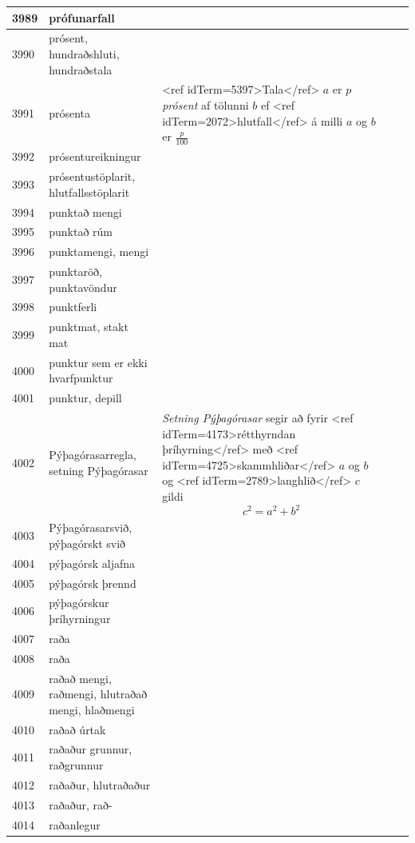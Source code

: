 \begin{longtable}{p{}|p{}|p{}|p{}|p{}}
\hline
3989 & prófunarfall &  &  &  \\
\hline
3990 & prósent, hundraðshluti, hundraðstala &  &  &  \\
\hline
3991 & prósenta & <ref idTerm=5397>Tala</ref> $a$ er \textit{$p$ prósent} af tölunni $b$ ef <ref idTerm=2072>hlutfall</ref> á milli $a$ og $b$ er $\frac{p}{100}$ &  &  \\
\hline
3992 & prósentureikningur &  &  &  \\
\hline
3993 & prósentustöplarit, hlutfallsstöplarit &  &  &  \\
\hline
3994 & punktað mengi &  &  &  \\
\hline
3995 & punktað rúm &  &  &  \\
\hline
3996 & punktamengi, mengi &  &  &  \\
\hline
3997 & punktaröð, punktavöndur &  &  &  \\
\hline
3998 & punktferli &  &  &  \\
\hline
3999 & punktmat, stakt mat &  &  &  \\
\hline
4000 & punktur sem er ekki hvarfpunktur &  &  &  \\
\hline
4001 & punktur, depill &  &  &  \\
\hline
4002 & Pýþagórasarregla, setning Pýþagórasar & \textit{Setning Pýþagórasar} segir að fyrir <ref idTerm=4173>rétthyrndan þríhyrning</ref> með <ref idTerm=4725>skammhliðar</ref> $a$ og $b$ og <ref idTerm=2789>langhlið</ref> $c$ gildi \[c^2 = a^2 + b^2\] &  & \\
\hline
4003 & Pýþagórasarsvið, pýþagórskt svið &  &  &  \\
\hline
4004 & pýþagórsk aljafna &  &  &  \\
\hline
4005 & pýþagórsk þrennd &  &  &  \\
\hline
4006 & pýþagórskur þríhyrningur &  &  &  \\
\hline
4007 & raða &  &  &  \\
\hline
4008 & raða &  &  &  \\
\hline
4009 & raðað mengi, raðmengi, hlutraðað mengi, hlaðmengi &  &  &  \\
\hline
4010 & raðað úrtak &  &  &  \\
\hline
4011 & raðaður grunnur, raðgrunnur &  &  &  \\
\hline
4012 & raðaður, hlutraðaður &  &  &  \\
\hline
4013 & raðaður, rað- &  &  &  \\
\hline
4014 & raðanlegur &  &  &  \\

\end{longtable}
